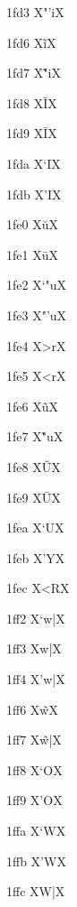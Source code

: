 \documentclass[11pt]{article}
\begin{document}
1fd3 X{\textgreek{"'i}}X

1fd6 X{\textgreek{\~{i}}}X

1fd7 X{\textgreek{\~{"i}}}X

1fd8 X{\textgreek{\u{I}}}X

1fd9 X{\textgreek{\={I}}}X

1fda X{\textgreek{`I}}X

1fdb X{\textgreek{'I}}X

1fe0 X{\textgreek{\u{u}}}X

1fe1 X{\textgreek{\={u}}}X

1fe2 X{\textgreek{`"u}}X

1fe3 X{\textgreek{"'u}}X

1fe4 X{\textgreek{>r}}X

1fe5 X{\textgreek{<r}}X

1fe6 X{\textgreek{\~{u}}}X

1fe7 X{\textgreek{\~{"u}}}X

1fe8 X{\textgreek{\u{U}}}X

1fe9 X{\textgreek{\={U}}}X

1fea X{\textgreek{`U}}X

1feb X{\textgreek{'Y}}X

1fec X{\textgreek{<R}}X

1ff2 X{\textgreek{`w|}}X

1ff3 X{\textgreek{w|}}X

1ff4 X{\textgreek{'w|}}X

1ff6 X{\textgreek{\~{w}}}X

1ff7 X{\textgreek{\~{w}|}}X

1ff8 X{\textgreek{`O}}X

1ff9 X{\textgreek{'O}}X

1ffa X{\textgreek{`W}}X

1ffb X{\textgreek{'W}}X

1ffc X{\textgreek{W|}}X
\end{document}
